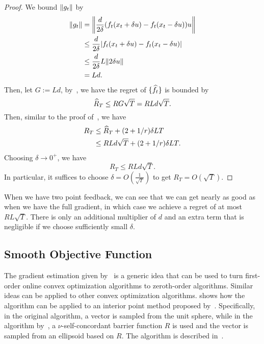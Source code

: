 \documentclass[11pt]{article}
\begin{document}
\begin{proof}
    We bound $\norm{g_t}$ by
    \begin{align*}
        \norm{g_t}
        &= \norm*{\frac{d}{2\delta}(f_t(x_t + \delta u) - f_t(x_t - \delta u))u}\\
        &\le \frac{d}{2\delta} \abs{f_t(x_t + \delta u) - f_t(x_t - \delta u)}\\
        &\le \frac{d}{2\delta} L\norm{2\delta u}\\
        &= Ld.
    \end{align*}
    Then, let $G := Ld$, by~, we have the regret of $\{\wh{f}_t\}$ is bounded by
    \[
        \wh{R}_T \le RG\sqrt{T} = RLd\sqrt{T}.
    \]
    Then, similar to the proof of~, we have
    \begin{align*}
        R_T &\le \wh{R}_T + (2 + 1/r)\delta LT\\
        &\le RLd\sqrt{T} + (2 + 1/r)\delta LT.
    \end{align*}
    Choosing $\delta \to 0^+$, we have
    \[
        R_T \le RLd\sqrt{T}.
    \]
    In particular, it suffices to choose $\delta = O(\frac{1}{\sqrt{T}})$ to get $R_T = O(\sqrt{T})$.
\end{proof}
When we have two point feedback, we can see that we can get nearly as good as when we have the full gradient, in which case we achieve a regret of at most $RL\sqrt{T}$. There is only an additional multiplier of $d$ and an extra term that is negligible if we choose sufficiently small $\delta$.

\subsection{Smooth Objective Function}

The gradient estimation given by~\cite{flaxman2005online} is a generic idea that can be used to turn first-order online convex optimization algorithms to zeroth-order algorithms.
Similar ideas can be applied to other convex optimization algorithms.
\cite{saha2011improved} shows how the algorithm can be applied to an interior point method proposed by~\cite{abernethy2008competing,abernethy2009beating}.
Specifically, in the original algorithm, a vector is sampled from the unit sphere, while in the algorithm by~\cite{saha2011improved}, a $\nu$-self-concordant barrier function $R$ is used and the vector is sampled from an ellipsoid based on $R$.
The algorithm is described in~.
\end{document}
